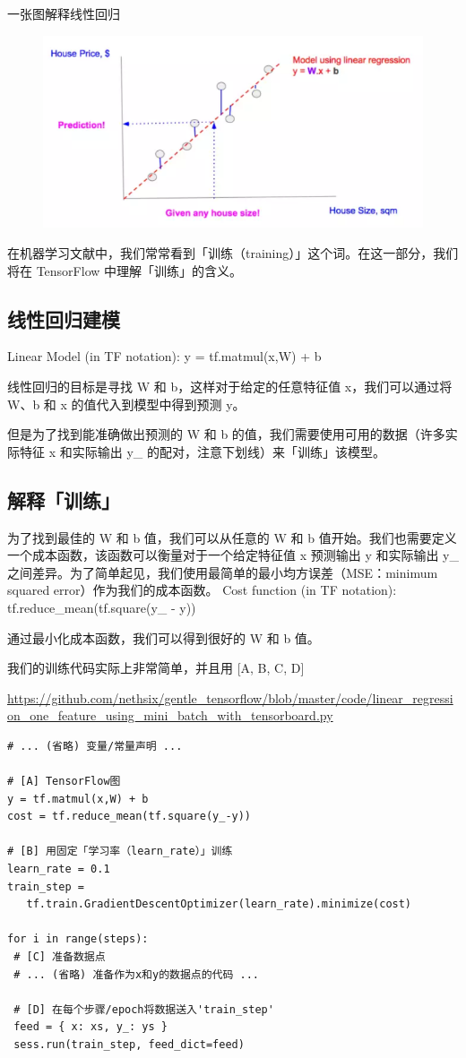 \documentclass[11pt]{book} %
\begin{document}
一张图解释线性回归

\begin{figure}
\centering
\includegraphics[width=0.7\linewidth]{figures/linear_regression}
\caption{}
\label{fig:linearregression}
\end{figure}


在机器学习文献中，我们常常看到「训练（training）」这个词。在这一部分，我们将在 TensorFlow 中理解「训练」的含义。

\subsection{线性回归建模}
Linear Model (in TF notation): y = tf.matmul(x,W) + b

线性回归的目标是寻找 W 和 b，这样对于给定的任意特征值 x，我们可以通过将 W、b 和 x 的值代入到模型中得到预测 y。

但是为了找到能准确做出预测的 W 和 b 的值，我们需要使用可用的数据（许多实际特征 x 和实际输出 y\_ 的配对，注意下划线）来「训练」该模型。

\subsection{解释「训练」}

为了找到最佳的 W 和 b 值，我们可以从任意的 W 和 b 值开始。我们也需要定义一个成本函数，该函数可以衡量对于一个给定特征值 x 预测输出 y 和实际输出 y\_ 之间差异。为了简单起见，我们使用最简单的最小均方误差（MSE：minimum squared error）作为我们的成本函数。
Cost function (in TF notation): tf.reduce\_mean(tf.square(y\_ - y))

通过最小化成本函数，我们可以得到很好的 W 和 b 值。

我们的训练代码实际上非常简单，并且用 [A, B, C, D]

 \url{https://github.com/nethsix/gentle_tensorflow/blob/master/code/linear_regression_one_feature_using_mini_batch_with_tensorboard.py}

\begin{verbatim}
# ... (省略) 变量/常量声明 ...

# [A] TensorFlow图
y = tf.matmul(x,W) + b
cost = tf.reduce_mean(tf.square(y_-y))

# [B] 用固定「学习率（learn_rate）」训练
learn_rate = 0.1
train_step =
   tf.train.GradientDescentOptimizer(learn_rate).minimize(cost)

for i in range(steps):
 # [C] 准备数据点
 # ... (省略) 准备作为x和y的数据点的代码 ...

 # [D] 在每个步骤/epoch将数据送入'train_step'
 feed = { x: xs, y_: ys }
 sess.run(train_step, feed_dict=feed)
 \end{verbatim}
\end{document}
